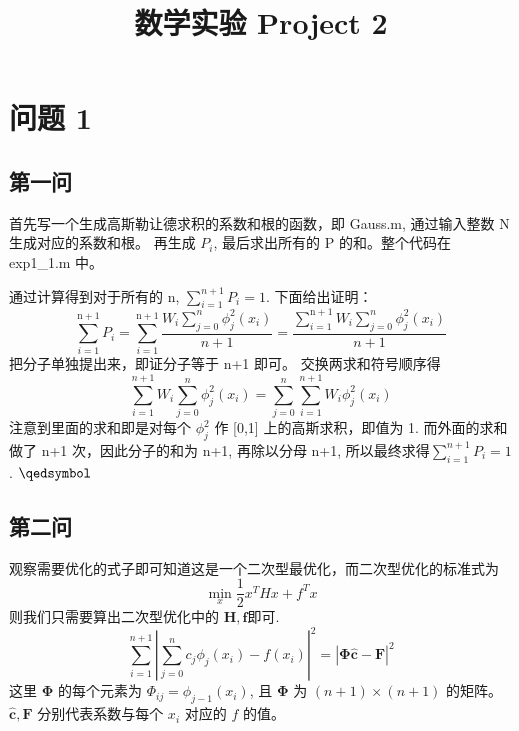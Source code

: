 \documentclass[11pt]{ctexart}
\title{数学实验 Project 2}
\begin{document}
    \maketitle
    \section{问题 1}

    \subsection{第一问}
    首先写一个生成高斯勒让德求积的系数和根的函数，即 Gauss.m, 通过输入整数 N 生成对应的系数和根。
    再生成 $P_i$, 最后求出所有的 P 的和。整个代码在 exp1\_1.m 中。

    通过计算得到对于所有的 n, \(\sum_{i=1}^{n+1}P_i=1\).
    下面给出证明：
    \begin{equation}
        \sum_{i=1}^{\mathrm{n}+1} P_{i}=\sum_{i=1}^{\mathrm{n}+1} \frac{W_{i} \sum_{j=0}^{n} \phi_{j}^{2}\left(x_{i}\right)}{n+1}
        = \frac{\sum_{i=1}^{\mathrm{n}+1}W_{i} \sum_{j=0}^{n} \phi_{j}^{2}\left(x_{i}\right)}{n+1}
    \end{equation}
    把分子单独提出来，即证分子等于 n+1 即可。
    交换两求和符号顺序得
    \begin{equation}
        \sum_{i=1}^{n+1}W_{i} \sum_{j=0}^{n} \phi_{j}^{2}\left(x_{i}\right)=\sum_{j=0}^{n}\sum_{i=1}^{n+1}W_i\phi_{j}^2(x_i)
    \end{equation}
    注意到里面的求和即是对每个 $\phi_j^2$ 作 [0,1] 上的高斯求积，即值为 1.
    而外面的求和做了 n+1 次，因此分子的和为 n+1, 再除以分母 n+1,
    所以最终求得\(\sum_{i=1}^{n+1}P_i=1\). \hfill \(\qedsymbol\)

    \subsection{第二问}
    观察需要优化的式子即可知道这是一个二次型最优化，而二次型优化的标准式为
    \begin{equation}
        \min _{x} \frac{1}{2} x^{T} H x+f^{T} x
    \end{equation}
    则我们只需要算出二次型优化中的 $\mathbf{H,f}$即可.
    \begin{equation}
        \sum_{i=1}^{n+1}\left|\sum_{j=0}^{n} c_{j} \phi_{j}\left(x_{i}\right)-f\left(x_{i}\right)\right|^{2}=
        |\mathbf{\Phi} \mathbf {\hat{c}}-\mathbf F|^2
    \end{equation}
    这里 $\mathbf{\Phi}$ 的每个元素为 $\Phi_{ij}=\phi _{j-1}(x_i)$, 且 \(\mathbf{\Phi}\) 为 \((n+1)\times(n+1)\) 的矩阵。
    \(\mathbf{\hat{c},F}\) 分别代表系数与每个 \(x_i\) 对应的 \(f\) 的值。
\end{document}
